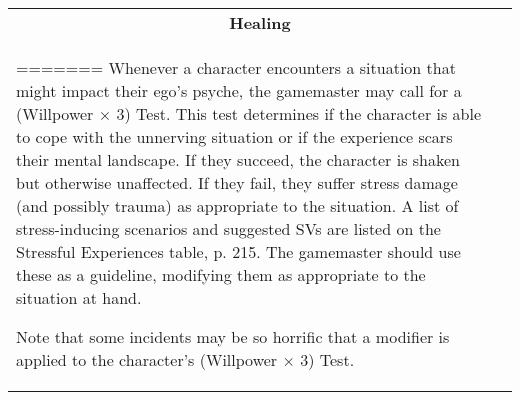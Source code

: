 \begin{table}
\begin{tabular}{|l|l|}
\hline
\multicolumn{2}{|c|}{\textbf{Healing} } \\
=======
Whenever a character encounters a situation that might impact their ego’s psyche, the gamemaster may call for a (Willpower $\times$ 3) Test. This test determines if the character is able to cope with the unnerving situation or if the experience scars their mental landscape. If they succeed, the character is shaken but otherwise unaffected. If they fail, they suffer stress damage (and possibly trauma) as appropriate to the situation. A list of stress-inducing scenarios and suggested SVs are listed on the Stressful Experiences table, p. 215. The gamemaster should use these as a guideline, modifying them as appropriate to the situation at hand.

Note that some incidents may be so horrific that a modifier is applied to the character’s (Willpower $\times$ 3) Test.


\end{tabular}
\end{table}
